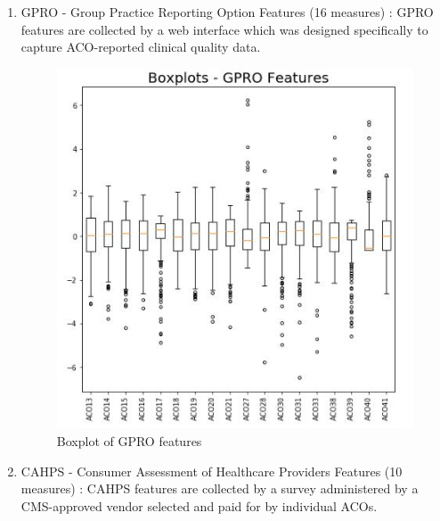 \documentclass[conference]{IEEEtran}
\begin{document}
\begin{enumerate}
\item GPRO - Group Practice Reporting Option Features (16 measures) : GPRO features are collected by a web interface which was designed specifically to capture ACO-reported clinical quality data.

\begin{figure}[H]
    \centering
    \includegraphics{BoxPlots_GPRO.jpg}
    \caption{Boxplot of GPRO features}
    \label{fig:boxgpro}
\end{figure}


\item CAHPS - Consumer Assessment of Healthcare Providers Features (10 measures) : CAHPS features are collected by a survey administered by a CMS-approved vendor selected and paid for by individual ACOs.


\end{enumerate}
\end{document}
